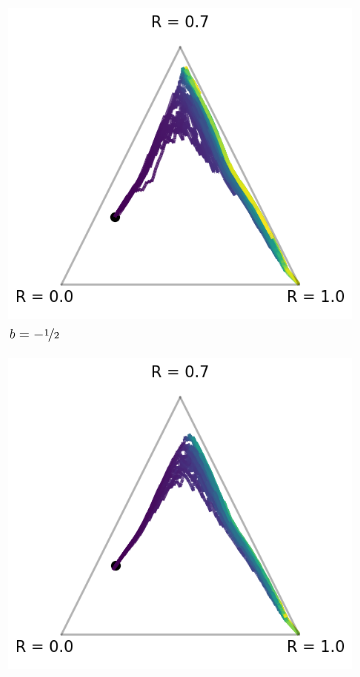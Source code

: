 \begin{figure}[!ht]
\centering
  \begin{subfigure}[b]{0.3\linewidth}
    \includegraphics[width=\textwidth]{articles/baselines/figs/mellowmax_transform/vanilla_minvar_-05.png}
    \caption{$b = - \nicefrac{1}{2}$}
  \end{subfigure}
    \begin{subfigure}[b]{0.3\linewidth}
    \includegraphics[width=\textwidth]{articles/baselines/figs/mellowmax_transform/vanilla_minvar_00.png}

\end{subfigure}
\end{figure}
